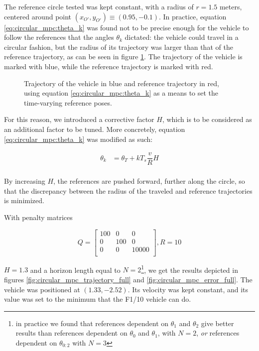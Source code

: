 The reference circle tested was kept constant, with a radius of $r=1.5$ meters,
centered around point $(x_{O'}, y_{O'}) \equiv (0.95, -0.1)$.
In practice, equation \ref{eq:circular_mpc:theta_k} was found not to be
precise enough for the vehicle to follow the references that the angles
$\theta_k$ dictated: the vehicle could travel in a circular fashion,
but the radius of its trajectory was larger than that of the reference
trajectory, as can be seen in figure \ref{fig:circular_mpc_without_H}.
The trajectory of the vehicle is marked with blue, while the reference
trajectory is marked with red.

\begin{figure}[H]\centering
  \scalebox{0.8}{}
  \caption{Trajectory of the vehicle in blue and reference trajectory in red,
    using equation \ref{eq:circular_mpc:theta_k} as a means to set the
    time-varying reference poses.}
  \label{fig:circular_mpc_without_H}
\end{figure}

For this reason, we introduced a corrective factor $H$, which is to
be considered as an additional factor to be tuned. More concretely,
equation \ref{eq:circular_mpc:theta_k} was modified as such:

\begin{align}
  \theta_k &= \theta_T + k T_s \dfrac{v}{R} H \\
\end{align}

By increasing $H$, the references are pushed forward, further along the circle,
so that the discrepancy between the radius of the traveled and reference
trajectories is minimized.

With penalty matrices

\begin{equation}
  Q =
  \begin{bmatrix}
    100 & 0   & 0 \\
      0 & 100 & 0 \\
      0 & 0   & 10000 \\
  \end{bmatrix}, R = 10
\end{equation}

$H=1.3$ and a horizon length equal to $N=2$\footnote{in practice we found that
references dependent on $\theta_1$ and $\theta_2$ give better results than
references dependent on $\theta_0$ and $\theta_1$, with $N=2$, \textit{or}
references dependent on $\theta_{0:2}$ with $N=3$}, we get the results depicted
in figures \ref{fig:circular_mpc_trajectory_full} and
\ref{fig:circular_mpc_error_full}. The vehicle was positioned at $(1.33, -2.52)$.
Its velocity was kept constant, and its value was set to the minimum that
the F1/10 vehicle can do.


